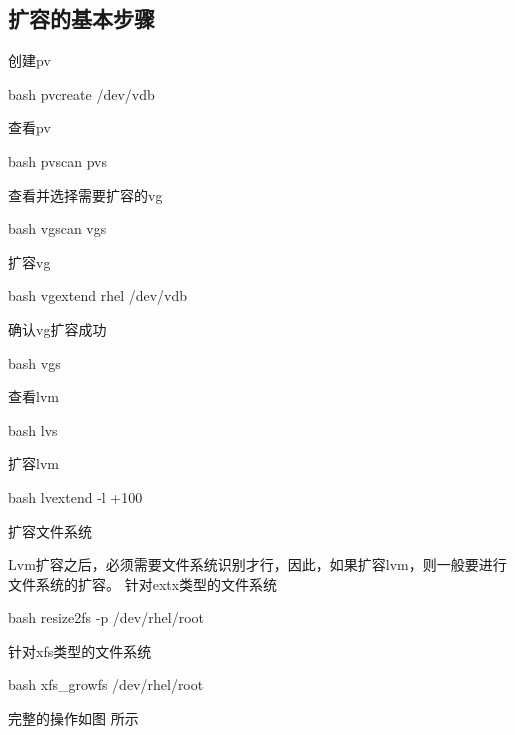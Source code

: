 \subsection{扩容的基本步骤}
\begin{outline}[enumerate]
  \1 创建pv
\begin{code-block}{bash}
pvcreate /dev/vdb
\end{code-block}

  \1 查看pv
\begin{code-block}{bash}
pvscan
pvs
\end{code-block}

  \1 查看并选择需要扩容的vg
\begin{code-block}{bash}
vgscan
vgs
\end{code-block}

  \1 扩容vg
\begin{code-block}{bash}
vgextend rhel /dev/vdb
\end{code-block}

  \1 确认vg扩容成功
\begin{code-block}{bash}
vgs
\end{code-block}

  \1 查看lvm
\begin{code-block}{bash}
lvs
\end{code-block}

  \1 扩容lvm
\begin{code-block}{bash}
lvextend -l +100%
\end{code-block}

  \1 扩容文件系统

      Lvm扩容之后，必须需要文件系统识别才行，因此，如果扩容lvm，则一般要进行文件系统的扩容。
      针对extx类型的文件系统
\begin{code-block}{bash}
resize2fs -p /dev/rhel/root
\end{code-block}

      针对xfs类型的文件系统
\begin{code-block}{bash}
xfs_growfs /dev/rhel/root
\end{code-block}

\end{outline}
完整的操作如图 所示
